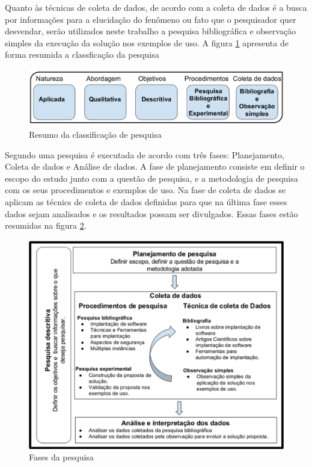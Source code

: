 Quanto às técnicas de coleta de dados, de acordo com \cite{gerhardt2009metodos}
a coleta de dados é a busca por informações para a elucidação do fenômeno ou
fato que o pesquisador quer desvendar, serão utilizados neste trabalho a pesquisa
bibliográfica e observação simples da execução da solução nos exemplos de uso.
A figura \ref{fig:metodologia1} apresenta de forma resumida a classficação da pesquisa

\begin{figure}[h]
  \centering
  \includegraphics[width=1.0\textwidth]
      {figuras/metodologia1.eps}
  \caption{Resumo da classificação de pesquisa}
  \label{fig:metodologia1}
\end{figure}

Segundo \cite{andre2008estudo} uma pesquisa é executada de acordo com três fases:
Planejamento, Coleta de dados e Análise de dados. A fase de planejamento consiste
em definir o escopo do estudo junto com a questão de pesquisa, e a metodologia
de pesquisa com os seus procedimentos e exemplos de uso. Na fase de coleta de dados
se aplicam as técnics de coleta de dados definidas para que na última fase esses
dados sejam analisados e os resultados possam ser divulgados. Essas fases estão
resumidas na figura \ref{fig:metodologia2}.

\begin{figure}[H]
  \centering
  \includegraphics[width=1.0\textwidth]
      {figuras/metodologia2.eps}
  \caption{Fases da pesquisa}
  \label{fig:metodologia2}
\end{figure}

